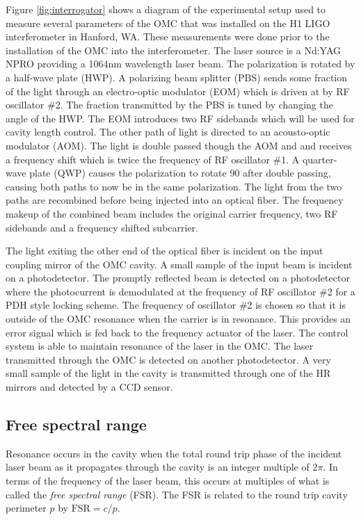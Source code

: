 Figure \ref{fig:interrogator} shows a diagram of the experimental setup used to measure several parameters of the OMC that was installed on the H1 LIGO interferometer in Hanford, WA. %
These measurements were done prior to the installation of the OMC into the interferometer. %
The laser source is a Nd:YAG NPRO providing a 1064nm wavelength laser beam. %
The polarization is rotated by a half-wave plate (HWP). %
A polarizing beam splitter (PBS) sends some fraction of the light through an electro-optic modulator (EOM) which is driven at by RF oscillator \#2. %
The fraction transmitted by the PBS is tuned by changing the angle of the HWP. %
The EOM introduces two RF sidebands which will be used for cavity length control. %
The other path of light is directed to an acousto-optic modulator (AOM). %
The light is double passed though the AOM and and receives a frequency shift which is twice the frequency of RF oscillator \#1. %
A quarter-wave plate (QWP) causes the polarization to rotate 90\degrees{} after double passing, causing both paths to now be in the same polarization. %
The light from the two paths are recombined before being injected into an optical fiber. %
The frequency makeup of the combined beam includes the original carrier frequency, two RF sidebands and a frequency shifted subcarrier.

The light exiting the other end of the optical fiber is incident on the input coupling mirror of the OMC cavity. %
A small sample of the input beam is incident on a photodetector. %
The promptly reflected beam is detected on a photodetector where the photocurrent is demodulated at the frequency of RF oscillator \#2 for a PDH style locking scheme. %
The frequency of oscillator \#2 is chosen so that it is outside of the OMC resonance when the carrier is in resonance. %
This provides an error signal which is fed back to the frequency actuator of the laser. %
The control system is able to maintain resonance of the laser in the OMC. %
The laser transmitted through the OMC is detected on another photodetector. %
A very small sample of the light in the cavity is transmitted through one of the HR mirrors and detected by a CCD sensor.

\subsection{Free spectral range}
\label{sec:FSR}
Resonance occurs in the cavity when the total round trip phase of the incident laser beam as it propagates through the cavity is an integer multiple of $2\pi$. %
In terms of the frequency of the laser beam, this occurs at multiples of what is called the \emph{free spectral range} (FSR). %
The FSR is related to the round trip cavity perimeter $p$ by $\mathrm{FSR}=c/p$.

